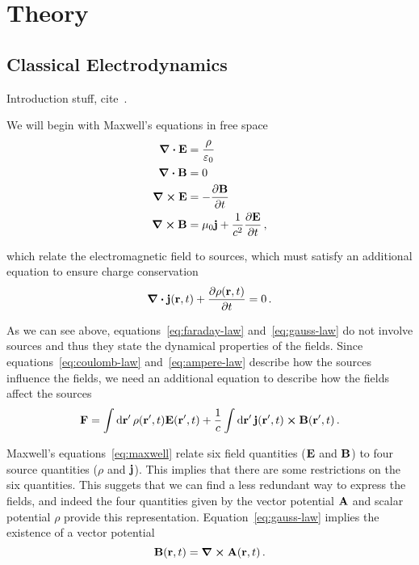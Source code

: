 \documentclass[class=report, crop=false]{standalone}
\begin{document}
\chapter{Theory}%
\label{chap:Theory}

\section{Classical Electrodynamics}
\label{sect:classical-electrodynamics}

{\color{red} Introduction stuff, cite~\textcite{eisenberg_nucleartheory_1978,jackson_classicalelectrodynamics_1999}}.

We will begin with Maxwell's equations in free space
\begin{subequations}%
  \label{eq:maxwell}
  \begin{align}
    \div{\vb{E}} & = \frac{\rho}{\varepsilon_0} \label{eq:coulomb-law} \\
    \div{\vb{B}} & = 0 \label{eq:gauss-law} \\
    \curl{\vb{E}} & = - \pdv{\vb{B}}{t} \label{eq:faraday-law} \\
    \curl{\vb{B}} & = \mu_0 \vb{j} + \frac{1}{c^2} \pdv{\vb{E}}{t} \,, \label{eq:ampere-law}
  \end{align}
\end{subequations}

which relate the electromagnetic field to sources, which must satisfy an additional
equation to ensure charge conservation
\begin{equation}
  \label{eq:continuity-equation}
  \div{\vb{j}(\vb{r}, t)} + \pdv{\rho(\vb{r}, t)}{t} = 0 \,.
\end{equation}

As we can see above, equations~\eqref{eq:faraday-law} and~\eqref{eq:gauss-law}
do not involve sources and thus they state the dynamical properties of the fields.
Since equations~\eqref{eq:coulomb-law} and~\eqref{eq:ampere-law} describe how
the sources influence the fields, we need an additional equation to describe how
the fields affect the sources
\[
  \vb{F} = \int \dd{\vb{r}'} \rho(\vb{r}', t) \vb{E}(\vb{r}', t) +
           \frac{1}{c} \int \dd{\vb{r}'} \vb{j}(\vb{r}', t) \cross \vb{B}(\vb{r}', t)\,.
\]

Maxwell's equations~\eqref{eq:maxwell} relate six field quantities (\(\vb{E}\) and \(\vb{B}\))
to four source quantities (\(\rho\) and \(\vb{j}\)). This implies that there are some
restrictions on the six quantities. This suggets that we can find a less redundant
way to express the fields, and indeed the four quantities given by the
vector potential \(\vb{A}\) and scalar potential \(\rho\) provide this representation.
Equation~\eqref{eq:gauss-law} implies the existence of a vector potential
\begin{equation}
  \label{eq:vector-potential}
  \vb{B}(\vb{r}, t) = \curl{\vb{A}(\vb{r}, t)}\,.
\end{equation}
\end{document}
